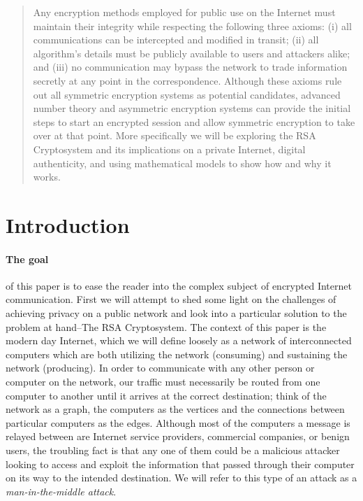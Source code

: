 \documentclass[12pt]{article}
\begin{document}
\maketitle

\begin{abstract}
Any encryption methods employed for public use on the Internet must maintain their integrity while respecting the following three axioms: (i) all communications can be intercepted and modified in transit; (ii) all algorithm's details must be publicly available to users and attackers alike; and (iii) no communication may bypass the network to trade information secretly at any point in the correspondence.  Although these axioms rule out all symmetric encryption systems as potential candidates, advanced number theory and asymmetric encryption systems can provide the initial steps to start an encrypted session and allow symmetric encryption to take over at that point.  More specifically we will be exploring the RSA Cryptosystem and its implications on a private Internet, digital authenticity, and using mathematical models to show how and why it works.  
\end{abstract}

\section{Introduction}

\paragraph{The goal} of this paper is to ease the reader into the complex subject of encrypted Internet communication.  First we will attempt to shed some light on the challenges of achieving privacy on a public network and look into a particular solution to the problem at hand--The RSA Cryptosystem.  The context of this paper is the modern day Internet, which we will define loosely as a network of interconnected computers which are both utilizing the network (consuming) and sustaining the network (producing).  In order to communicate with any other person or computer on the network, our traffic must necessarily be routed from one computer to another until it arrives at the correct destination; think of the network as a graph, the computers as the vertices and the connections between particular computers as the edges.  Although most of the computers a message is relayed between are Internet service providers, commercial companies, or benign users, the troubling fact is that any one of them could be a malicious attacker looking to access and exploit the information that passed through their computer on its way to the intended destination.  We will refer to this type of an attack as a \textit{man-in-the-middle attack}.
\end{document}
